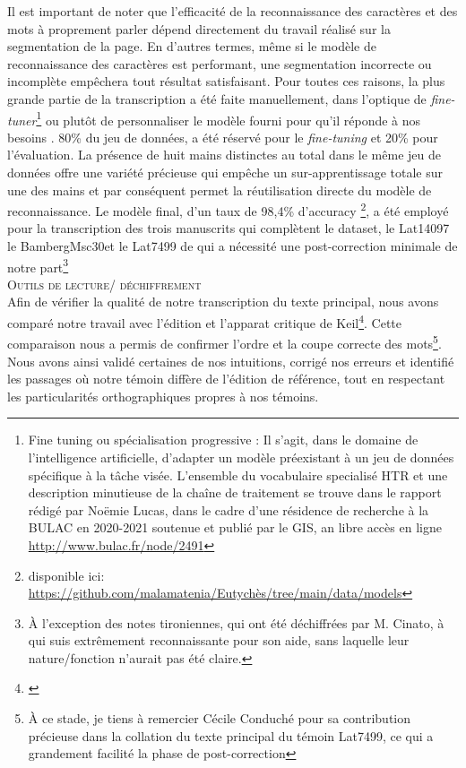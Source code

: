 \documentclass[a4paper, twoside, 12pt]{book}
\begin{document}
Il est important de noter que l’efficacité de la reconnaissance des caractères et des mots à proprement parler dépend directement du travail réalisé sur la segmentation de la page. En d’autres termes, même si le modèle de reconnaissance des caractères est performant, une segmentation incorrecte ou
incomplète empêchera tout résultat satisfaisant. Pour toutes ces raisons, la plus grande partie de la transcription a été faite manuellement, dans l'optique de \textit{fine-tuner}\footnote{ \og{} Fine tuning ou spécialisation progressive : Il s’agit, dans le domaine de l’intelligence artificielle, d’adapter un modèle préexistant à un jeu de données spécifique à la tâche visée.\fg{} L'ensemble du vocabulaire specialisé HTR et une description minutieuse de la chaîne de traitement se trouve dans le rapport rédigé par Noëmie Lucas, dans le cadre d'une résidence de recherche à la BULAC en 2020-2021 soutenue et publié par le GIS, an libre accès en ligne \url{http://www.bulac.fr/node/2491}
} ou plutôt de personnaliser le modèle fourni pour qu'il réponde à nos besoins . 80\% du jeu de données, a été réservé pour le \textit{fine-tuning} et 20\% pour l'évaluation. La présence de huit mains distinctes au total dans le même jeu de données offre une variété précieuse qui empêche un sur-apprentissage totale sur une des mains et par conséquent permet la réutilisation directe du modèle de reconnaissance. Le modèle final, d'un taux de 98,4\% d'accuracy \footnote{disponible ici: \url{https://github.com/malamatenia/Eutychès/tree/main/data/models}}, a été employé pour la transcription des trois manuscrits qui complètent le dataset, le Lat14097 le BambergMsc30et le Lat7499 de  qui a nécessité une post-correction minimale de notre part\footnote{À l'exception des notes tironiennes, qui ont été déchiffrées par M. Cinato, à qui suis extrêmement reconnaissante pour son aide, sans laquelle leur nature/fonction n'aurait pas été claire.} \\


\textsc{Outils de lecture/ déchiffrement}\\

Afin de vérifier la qualité de notre transcription du texte principal, nous avons comparé notre travail avec l'édition et l'apparat critique de Keil\footnote{\cite{keil1857grammatici}}. Cette comparaison nous a permis de confirmer l'ordre et la coupe correcte des mots\footnote{À ce stade, je tiens à remercier Cécile Conduché pour sa contribution précieuse dans la collation du texte principal du témoin Lat7499, ce qui a grandement facilité la phase de post-correction}. Nous avons ainsi validé certaines de nos intuitions, corrigé nos erreurs et identifié les passages où notre témoin diffère de l'édition de référence, tout en respectant les particularités orthographiques propres à nos témoins.\\
\end{document}

